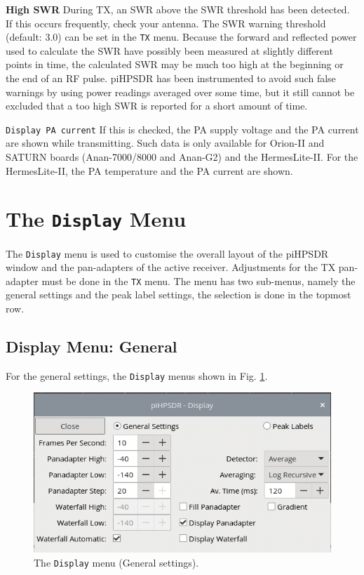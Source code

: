 \documentclass[12pt]{book}
\def\rett#1{\texttt{\color{red}#1}}
\def\bltt#1{\texttt{\color{blue}#1}}
\def\pH{pi\-HPSDR\xspace}
\begin{document}
\textbf{High SWR} During TX, an SWR above the SWR threshold has been detected. If this occurs
frequently, check your antenna. The SWR warning threshold (default: 3.0) can be set in the
\bltt{TX} menu. Because the forward and reflected power used to calculate the SWR have
possibly been measured at slightly different points in time, the calculated SWR may be
much too high at the beginning or the end of an RF pulse. \pH has been instrumented to
avoid such false warnings by using power readings averaged over some time, but it still
cannot be excluded that a too high SWR is reported for a short amount of time.

\rett{Display PA current} If this is checked, the PA supply voltage and the PA current
are shown while transmitting. Such data is only available for Orion-II and SATURN boards
(Anan-7000/8000 and Anan-G2) and the HermesLite-II.
For the HermesLite-II, the PA temperature and the PA current are shown.
\section{The \texttt{Display} Menu}

The \bltt{Display} menu is used to customise the overall layout of the \pH
window and the pan-adapters of the active receiver. Adjustments
for the TX pan-adapter must be done in the \bltt{TX} menu. The menu has two sub-menus,
namely the general settings and the peak label settings, the selection is done
in the topmost row.

\subsection{Display Menu: General}

For the general settings, the \bltt{Display} menus shown
in Fig. \ref{fig:DisplayMenuGeneral}.

\begin{figure}[ht]
\center
\includegraphics[scale=0.45]{DisplayMenuGeneral.png}
\caption{The \bltt{Display} menu (General settings).}
\label{fig:DisplayMenuGeneral}
\end{figure}
\end{document}

